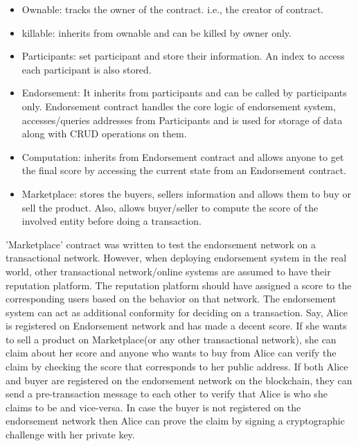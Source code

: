 \begin{itemize}
	\item Ownable: tracks the owner of the contract. i.e., the creator of
		contract. 
	\item killable: inherits from ownable and can be killed by owner only. 
	\item Participants: set participant and store their information. An index
		to access each participant is also stored. 
	\item Endorsement: It inherits from participants and can be called by
		participants only. Endorsement contract handles the core logic of
		endorsement system, accesses/queries addresses from Participants and is
		used for storage of data along with CRUD operations on them.  
	\item Computation: inherits from Endorsement contract and allows anyone to
		get the final score by accessing the current state from an Endorsement
		contract.
	\item Marketplace: stores the buyers, sellers information and allows them
		to buy or sell the product. Also, allows buyer/seller to compute the
		score of the involved entity before doing a transaction.  
\end{itemize}

'Marketplace' contract was written to test the endorsement network on a
transactional network. However, when deploying endorsement system in the real
world, other transactional network/online systems are assumed to have their
reputation platform. The reputation platform should have assigned a score to
the corresponding users based on the behavior on that network. The endorsement
system can act as additional conformity for deciding on a transaction. Say,
Alice is registered on Endorsement network and has made a decent score. If she
wants to sell a product on Marketplace(or any other transactional network), she
can claim about her score and anyone who wants to buy from Alice can verify the
claim by checking the score that corresponds to her public address. If both
Alice and buyer are registered on the endorsement network on the blockchain,
they can send a pre-transaction message to each other to verify that Alice is
who she claims to be and vice-versa. In case the buyer is not registered on the
endorsement network then Alice can prove the claim by signing a cryptographic
challenge with her private key. 

